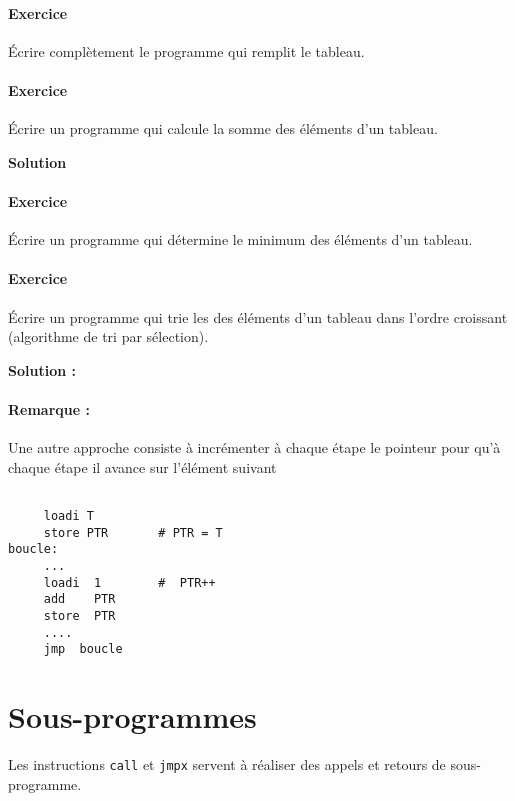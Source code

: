 \documentclass[10pt]{article}
\begin{document}
\paragraph{Exercice} Écrire complètement le programme qui remplit
le tableau.



\paragraph{Exercice} Écrire un programme qui calcule la somme des
éléments d'un tableau.

\textbf{Solution}



\paragraph{Exercice} Écrire un programme qui détermine le minimum
des éléments d'un tableau.

\paragraph{Exercice} Écrire un programme qui trie les
des éléments d'un tableau dans l'ordre croissant (algorithme de
tri par sélection).

\textbf{Solution : }



\paragraph{Remarque : } Une autre approche consiste à incrémenter
 à chaque étape le pointeur
pour qu'à chaque étape il avance sur l'élément suivant
\begin{lstlisting}

     loadi T
     store PTR       # PTR = T
boucle:
     ...
     loadi  1        #  PTR++
     add    PTR
     store  PTR
     ....
     jmp  boucle
\end{lstlisting}

\section{Sous-programmes}

Les instructions \texttt{call} et \texttt{jmpx} servent à réaliser
des appels et retours de sous-programme.
\end{document}
